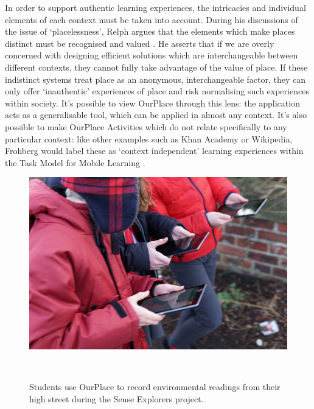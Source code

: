 In order to support authentic learning experiences, the intricacies and individual elements of each context must be taken into account. During his discussions of the issue of `placelessness', Relph argues that the elements which make places distinct must be recognised and valued \citep{Relph1976}. He asserts that if we are overly concerned with designing efficient solutions which are interchangeable between different contexts, they cannot fully take advantage of the value of place. If these indistinct systems treat place as an anonymous, interchangeable factor, they can only offer `inauthentic' experiences of place and risk normalising such experiences within society. It's possible to view OurPlace through this lens: the application acts as a generalisable tool, which can be applied in almost any context. It's also possible to make OurPlace Activities which do not relate specifically to any particular context: like other examples such as Khan Academy or Wikipedia, Frohberg would label these as `context independent' learning experiences within the Task Model for Mobile Learning \citep{Frohberg2009, Taylor2006}. 

\begin{figure}
\centering
  \includegraphics[width=0.85\columnwidth]{images/chapter09/senseExplorers.jpg}
  \caption[Students use OurPlace to record environmental readings from their high street]{Students use OurPlace to record environmental readings from their high street during the Sense Explorers project.}~\label{fig:senseExplorersHighSt}
\end{figure}

